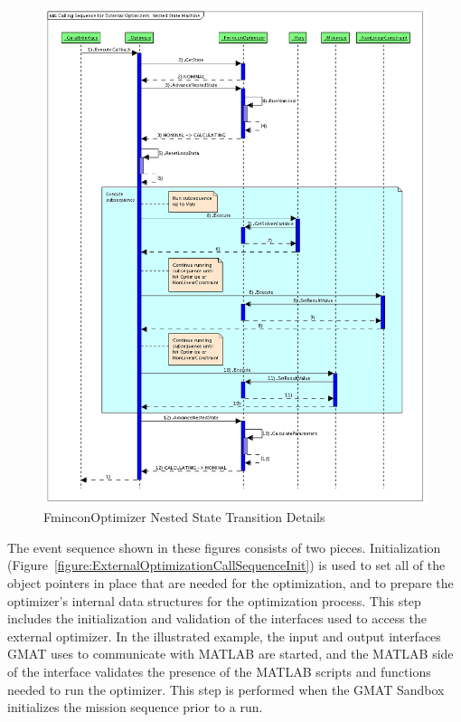 \begin{subfigures}
\begin{figure}
\begin{center}
\includegraphics[440,570]{Images/CallingSequenceforExternalOptimizersNestedStateMachine.png}
\caption{\label{figure:ExternalOptimizationCallSequenceNestedState}FminconOptimizer Nested State
Transition Details}
\end{center}
\end{figure}

\end{subfigures}

The event sequence shown in these figures consists of two pieces.  Initialization
(Figure~\ref{figure:ExternalOptimizationCallSequenceInit}) is used to set all of the object pointers
in place that are needed for the optimization, and to prepare the optimizer's internal data
structures for the optimization process.  This step includes the initialization and validation of
the interfaces used to access the external optimizer.  In the illustrated example, the input and
output interfaces GMAT uses to communicate with MATLAB are started, and the MATLAB side of the
interface validates the presence of the MATLAB scripts and functions needed to run the optimizer.
This step is performed when the GMAT Sandbox initializes the mission sequence prior to a run.

